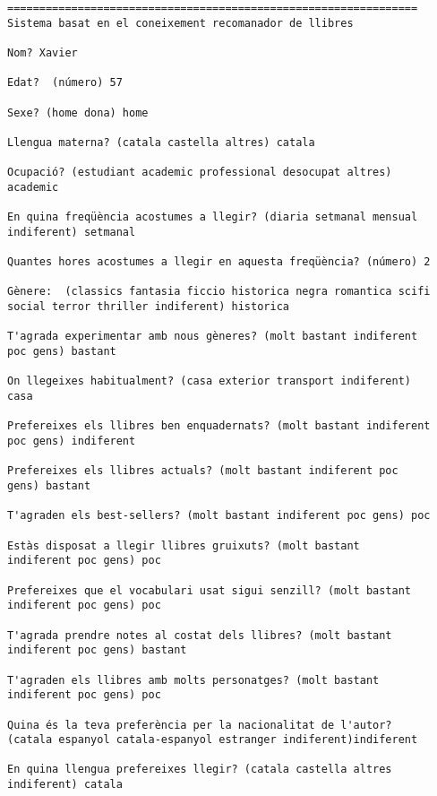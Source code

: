\begin{verbatim}
================================================================
Sistema basat en el coneixement recomanador de llibres

Nom? Xavier

Edat?  (número) 57

Sexe? (home dona) home

Llengua materna? (catala castella altres) catala

Ocupació? (estudiant academic professional desocupat altres)
academic

En quina freqüència acostumes a llegir? (diaria setmanal mensual
indiferent) setmanal

Quantes hores acostumes a llegir en aquesta freqüència? (número) 2

Gènere:  (classics fantasia ficcio historica negra romantica scifi
social terror thriller indiferent) historica

T'agrada experimentar amb nous gèneres? (molt bastant indiferent
poc gens) bastant

On llegeixes habitualment? (casa exterior transport indiferent)
casa

Prefereixes els llibres ben enquadernats? (molt bastant indiferent
poc gens) indiferent

Prefereixes els llibres actuals? (molt bastant indiferent poc
gens) bastant

T'agraden els best-sellers? (molt bastant indiferent poc gens) poc

Estàs disposat a llegir llibres gruixuts? (molt bastant
indiferent poc gens) poc

Prefereixes que el vocabulari usat sigui senzill? (molt bastant
indiferent poc gens) poc

T'agrada prendre notes al costat dels llibres? (molt bastant
indiferent poc gens) bastant

T'agraden els llibres amb molts personatges? (molt bastant
indiferent poc gens) poc

Quina és la teva preferència per la nacionalitat de l'autor?
(catala espanyol catala-espanyol estranger indiferent)indiferent

En quina llengua prefereixes llegir? (catala castella altres
indiferent) catala


\end{verbatim}
